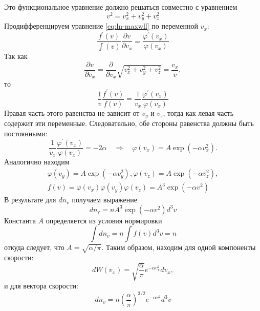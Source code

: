 Это функциональное уравнение должно решаться совместно с уравнением
\begin{equation*}
v^2=v_x^2+v_y^2+v_z^2
\end{equation*}
Продифференцируем уравнение \eqref{eq:ln-maxwll} по переменной $v_x$:
\begin{equation*}
\frac{f^{\prime}(v)}{\int(v)} \frac{\partial v}{\partial v_x}=\frac{\varphi^{\prime}\left(v_x\right)}{\varphi\left(v_x\right)}
\end{equation*}
Так как
\begin{equation*}
\frac{\partial v}{\partial v_x}=\frac{\partial}{\partial v_x} \sqrt{v_x^2+v_y^2+v_z^2}=\frac{v_x}{v},
\end{equation*}
то
\begin{equation*}
\frac{1}{v} \frac{f^{\prime}(v)}{f(v)}=\frac{1}{v_x} \frac{\varphi^{\prime}\left(v_x\right)}{\varphi\left(v_x\right)}
\end{equation*}
Правая часть этого равенства не зависит от $v_y$ и $v_z$, тогда как левая часть содержит эти переменные. Следовательно, обе стороны равенства должны быть постоянными:
\begin{equation*}
	\frac{1}{v_x} \frac{\varphi^{\prime}\left(v_x\right)}{\varphi\left(v_x\right)}=-2 \alpha \quad \Rightarrow \quad \varphi\left(v_x\right)=A \exp \left(-\alpha v_x^2\right).
\end{equation*}
Аналогично находим
\begin{gather*}
\varphi\left(v_y\right)=A \exp \left(-\alpha v_y^2\right), \varphi\left(v_z\right)=A \exp \left(-\alpha v_z^2\right), \\
f(v)=\varphi\left(v_x\right) \varphi\left(v_y\right) \varphi\left(v_z\right)=A^3 \exp \left(-\alpha v^2\right)
\end{gather*}
В результате для $d n_{\mathrm{v}}$ получаем выражение
\begin{equation*}
d n_{\mathrm{v}}=n A^3 \exp \left(-\alpha v^2\right) d^3 v
\end{equation*}
Константа $A$ определяется из условия нормировки
\begin{equation*}
\int d n_v=n \int f(v) d^3 v=n
\end{equation*}
откуда следует, что $A=\sqrt{\alpha / \pi}$.
Таким образом, находим для одной компоненты скорости:
\begin{equation*}
d W\left(v_x\right)=\sqrt{\frac{\alpha}{\pi}} e^{-\alpha v_x^2} d v_x,
\end{equation*}
и для вектора скорости:
\begin{equation*}
d n_v=n\left(\frac{\alpha}{\pi}\right)^{3 / 2} e^{-\alpha v^2} d^3 v
\end{equation*}
